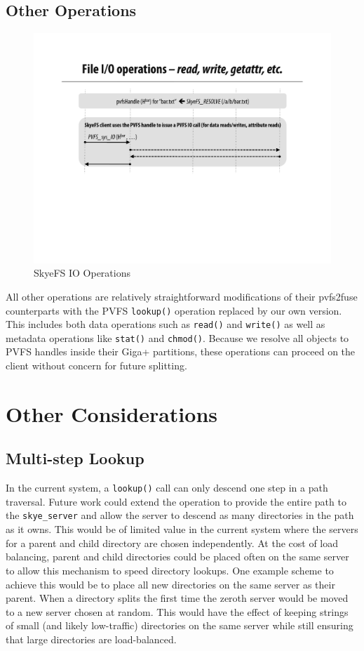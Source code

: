 \documentclass[letterpaper]{article}
\newcommand{\code}[1]{\texttt{#1}}
\begin{document}
\subsection{Other Operations}
\begin{figure}
\begin{center}
\includegraphics[scale=0.4]{figure-other}
\end{center}
\caption{SkyeFS IO Operations}
\end{figure}
All other operations are relatively straightforward modifications of their
pvfs2\-fuse counterparts with the PVFS \code{lookup()} operation replaced by
our own version.  This includes both data operations such as \code{read()} and
\code{write()} as well as metadata operations like \code{stat()} and
\code{chmod()}.  Because we resolve all objects to PVFS handles inside their
Giga+ partitions, these operations can proceed on the client without concern
for future splitting.

\section{Other Considerations}
\subsection{Multi-step Lookup}
In the current system, a \code{lookup()} call can only descend one step in a path
traversal.  Future work could extend the operation to provide the entire path
to the \code{skye\_\-server} and allow the server to descend as many
directories in the path as it owns.  This would be of limited value in the
current system where the servers for a parent and child directory are chosen
independently.  At the cost of load balancing, parent and child directories
could be placed often on the same server to allow this mechanism to speed
directory lookups.  One example scheme to achieve this would be to place all
new directories on the same server as their parent.  When a directory splits
the first time the zeroth server would be moved to a new server chosen at
random.  This would have the effect of keeping strings of small (and likely
low-traffic) directories on the same server while still ensuring that large
directories are load-balanced.
\end{document}
